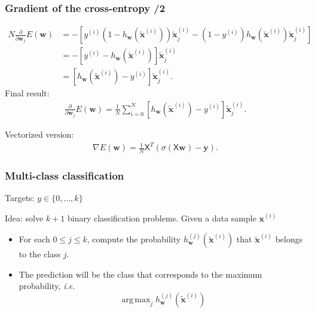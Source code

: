 \documentclass{beamer}
\DeclareMathOperator*{\argmax}{arg\,max}
\begin{document}
	\begin{frame}
		\frametitle{Gradient of the cross-entropy /2}
		\begin{align*}
			N\frac{\partial}{\partial \bm{w}_j} E(\bm{w})&= -[y^{(i)}(1 - h_{\bm{w}}(\tilde{\bm{x}}^{(i)}))\tilde{\bm{x}}^{(i)}_j - (1-y^{(i)})h_{\bm{w}}(\tilde{\bm{x}}^{(i)})\tilde{\bm{x}}^{(i)}_j]\\
			&= -[y^{(i)}-  h_{\bm{w}}(\tilde{\bm{x}}^{(i)})]\tilde{\bm{x}}^{(i)}_j\\
			& = [h_{\bm{w}}(\tilde{\bm{x}}^{(i)})- y^{(i)}]\tilde{\bm{x}}^{(i)}_j.
		\end{align*}
	Final result:
		\begin{align*}
			\frac{\partial}{\partial \bm{w}_j} E(\bm{w}) = \frac{1}{N} \sum_{i=0}^{N} [h_{\bm{w}}(\tilde{\bm{x}}^{(i)})- y^{(i)}]\tilde{\bm{x}}^{(i)}_j.
		\end{align*}
	
	Vectorized version:
	\begin{align*}
		\nabla E(\bm{w}) = \frac{1}{N} \mathsf{X}^T(\sigma(\mathsf{X}\bm{w}) - \bm{y}).
	\end{align*}
	
	\end{frame}

	\begin{frame}
		\frametitle{Multi-class classification}
		
		Targets: $y \in \{0, \dots, k\}$
		
		\vspace{5mm}
		
		Idea: solve $k+1$ binary classification problems. Given a data sample $\bm{x}^{(i)}$
		\begin{itemize}
			\item For each $0\leq j \leq k$, compute the probability $h^{(j)}_{\bm{w}}(\tilde{\bm{x}}^{(i)})$ that $\tilde{\bm{x}}^{(i)}$ belongs to the class $j$.
			\item The prediction will be the class that corresponds to the maximum probability, \textit{i.e.} 
			$$\argmax_j h^{(j)}_{\bm{w}}(\tilde{\bm{x}}^{(i)})$$
		\end{itemize}
		
		
	\end{frame}
\end{document}
